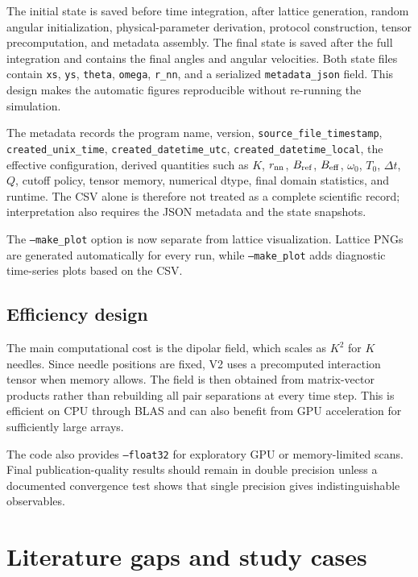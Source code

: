 \documentclass[11pt,a4paper]{article}
\newcommand{\code}[1]{\texttt{#1}}
\begin{document}
The initial state is saved before time integration, after lattice generation, random angular initialization, physical-parameter derivation, protocol construction, tensor precomputation, and metadata assembly. The final state is saved after the full integration and contains the final angles and angular velocities. Both state files contain \code{xs}, \code{ys}, \code{theta}, \code{omega}, \code{r\_nn}, and a serialized \code{metadata\_json} field. This design makes the automatic figures reproducible without re-running the simulation.

The metadata records the program name, version, \code{source\_file\_timestamp}, \code{created\_unix\_time}, \code{created\_datetime\_utc}, \code{created\_datetime\_local}, the effective configuration, derived quantities such as $K$, $r_{\rm nn}$, $B_{\rm ref}$, $B_{\rm eff}$, $\omega_0$, $T_0$, $\Delta t$, $Q$, cutoff policy, tensor memory, numerical dtype, final domain statistics, and runtime. The CSV alone is therefore not treated as a complete scientific record; interpretation also requires the JSON metadata and the state snapshots.

The \code{--make\_plot} option is now separate from lattice visualization. Lattice PNGs are generated automatically for every run, while \code{--make\_plot} adds diagnostic time-series plots based on the CSV.

\subsection{Efficiency design}


The main computational cost is the dipolar field, which scales as $K^2$ for $K$ needles. Since needle positions are fixed, V2 uses a precomputed interaction tensor when memory allows. The field is then obtained from matrix-vector products rather than rebuilding all pair separations at every time step. This is efficient on CPU through BLAS and can also benefit from GPU acceleration for sufficiently large arrays.

The code also provides \code{--float32} for exploratory GPU or memory-limited scans. Final publication-quality results should remain in double precision unless a documented convergence test shows that single precision gives indistinguishable observables.

\section{Literature gaps and study cases}
\label{sec:gaps}
\end{document}
